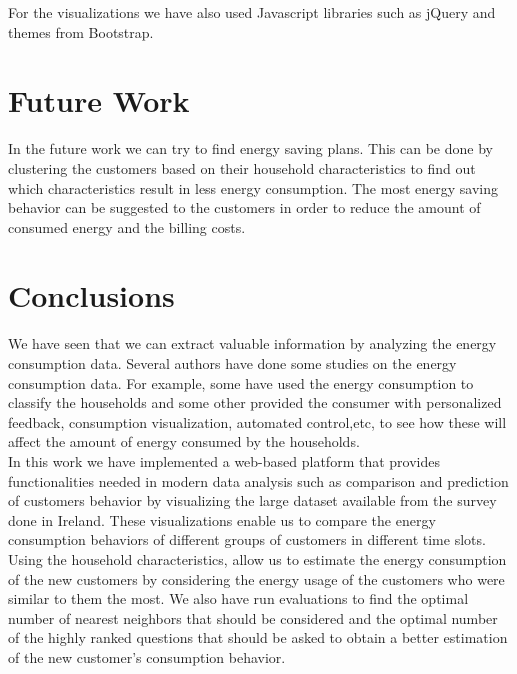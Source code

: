 \documentclass{sig-alternate-10pt}
\begin{document}
For the visualizations we have also used Javascript libraries such as jQuery and themes from Bootstrap.\cite{7,8}\\

\section{Future Work}

In the future work we can try to find energy saving plans. This can be done by clustering the customers based on their household characteristics to find out which characteristics result in less energy consumption. The most energy saving behavior can be suggested to the customers in order to reduce the amount of consumed energy and the billing costs. 

\section{Conclusions}

We have seen that we can extract valuable information by analyzing the energy consumption data. Several authors have done some studies on the energy consumption data. For example, some have used the energy consumption to classify the households and some other provided the consumer with personalized feedback, consumption visualization, automated control,etc, to see how these will affect the amount of energy consumed by the households.\\

In this work we have implemented a web-based platform that provides  functionalities needed in modern data analysis such as comparison and prediction of customers behavior by visualizing the large dataset available from the survey done in Ireland. These visualizations enable us to compare the energy consumption behaviors of different groups of customers in different time slots. Using the household characteristics, allow us to estimate the energy consumption of the new customers by considering the energy usage of the customers who were similar to them the most. We also have run evaluations to find the optimal number of nearest neighbors that should be considered and the optimal number of the highly ranked questions that should be asked to obtain a better estimation of the new customer's consumption behavior.\\



\end{document}
